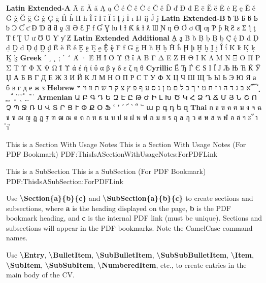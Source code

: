 \documentclass[letterpaper,MMMyyyy,nonstopmode]{simpleresumecv}
\newcommand{\Code}[1]{\mbox{\textbf{#1}}}
\newcommand{\CodeCommand}[1]{\mbox{\textbf{\textbackslash{#1}}}}
\begin{document}
\begin{Body}
\begin{Detail}
\Item
\textbf{Latin Extended-A}
Ā ā Ă ă Ą ą Ć ć Ĉ ĉ Ċ ċ Č č Ď ď Đ đ Ē ē Ĕ ĕ Ė ė Ę ę Ě ě Ĝ ĝ Ğ ğ Ġ ġ Ģ ģ Ĥ ĥ Ħ ħ Ĩ ĩ Ī ī Ĭ ĭ Į į İ ı Ĳ ĳ Ĵ ĵ
\textbf{Latin Extended-B}
ƀ Ɓ Ƃ ƃ Ƅ ƅ Ɔ Ƈ ƈ Ɖ Ɗ Ƌ ƌ ƍ Ǝ Ə Ɛ Ƒ ƒ Ɠ Ɣ ƕ Ɩ Ɨ Ƙ ƙ ƚ ƛ Ɯ Ɲ ƞ Ɵ Ơ ơ Ƣ ƣ Ƥ ƥ Ʀ Ƨ ƨ Ʃ ƪ ƫ Ƭ ƭ Ʈ Ư ư Ʊ Ʋ Ƴ ƴ Ƶ
\textbf{Latin Extended Additional}
Ḁ ḁ Ḃ ḃ Ḅ ḅ Ḇ ḇ Ḉ ḉ Ḋ ḋ Ḍ ḍ Ḏ ḏ Ḑ ḑ Ḓ ḓ Ḕ ḕ Ḗ ḗ Ḙ ḙ Ḛ ḛ Ḝ ḝ Ḟ ḟ Ḡ ḡ Ḣ ḣ Ḥ ḥ Ḧ ḧ Ḩ ḩ Ḫ ḫ Ḭ ḭ Ḯ ḯ Ḱ ḱ Ḳ ḳ Ḵ ḵ
\textbf{Greek}
ʹ ͵ ͺ ; ΄ ΅ Ά · Έ Ή Ί Ό Ύ Ώ ΐ Α Β Γ Δ Ε Ζ Η Θ Ι Κ Λ Μ Ν Ξ Ο Π Ρ Σ Τ Υ Φ Χ Ψ Ω Ϊ Ϋ ά έ ή ί ΰ α β γ δ ε ζ η θ
\textbf{Cyrillic}
Ё Ђ Ѓ Є Ѕ І Ї Ј Љ Њ Ћ Ќ Ў Џ А Б В Г Д Е Ж З И Й К Л М Н О П Р С Т У Ф Х Ц Ч Ш Щ Ъ Ы Ь Э Ю Я а б в г д е ж з
\textbf{Hebrew}
א ב ג ד ה ו ז ח ט י ך כ ל ם מ ן נ ס ע ף פ ץ צ ק ר ש ת װ ױ ײ ֝ ֞ ֟ ֠ ֡ ֣ ֤ ֥ ֦ ֧ ֨ ֩ ֪ ֫ ֬ ֭ ֮ ֯ ְ ֱ ֒ ֓ ֔
\textbf{Armenian}
{\UseSecondaryFont
Ա Բ Գ Դ Ե Զ Է Ը Թ Ժ Ի Լ Խ Ծ Կ Հ Ձ Ղ Ճ Մ Յ Ն Շ Ո Չ Պ Ջ Ռ Ս Վ Տ Ր Ց Ւ Փ Ք Օ Ֆ ՙ ՚ ՛ ՜ ՝ ՞ ՟ ա բ գ դ ե զ}
\textbf{Thai}
{\UseSecondaryFont
ก ข ฃ ค ฅ ฆ ง จ ฉ ช ซ ฌ ญ ฎ ฏ ฐ ฑ ฒ ณ ด ต ถ ท ธ น บ ป ผ ฝ พ ฟ ภ ม ย ร ฤ ล ฦ ว ศ ษ ส ห ฬ อ ฮ ฯ ะ ั า ำ ิ}
\end{Detail}

\newpage


\begingroup
\color{blue}

\Section
{This is a\newline
Section\newline
With\newline
Usage Notes}
{This is a Section With Usage Notes (For PDF Bookmark)}
{PDF:ThisIsASectionWithUsageNotes:ForPDFLink}

\SubSection
{This is a SubSection}
{This is a SubSection (For PDF Bookmark)}
{PDF:ThisIsASubSection:ForPDFLink}

\BigGap
\BulletItem
Use \CodeCommand{Section\{a\}\{b\}\{c\}} and
\CodeCommand{SubSection\{a\}\{b\}\{c\}}
to create sections and subsections, where
\Code{a} is the heading displayed on the page,
\Code{b} is the PDF bookmark heading, and
\Code{c} is the internal PDF link (must be unique).
Sections and subsections will appear in the PDF bookmarks.
Note the CamelCase command names.

\Gap
\BulletItem
Use
\CodeCommand{Entry},
\CodeCommand{BulletItem},
\CodeCommand{SubBulletItem},
\CodeCommand{SubSubBulletItem},
\CodeCommand{Item},
\CodeCommand{SubItem},
\CodeCommand{SubSubItem},
\CodeCommand{NumberedItem},
etc.,
to create entries in the main body of the CV.


\end{Body}
\end{document}
